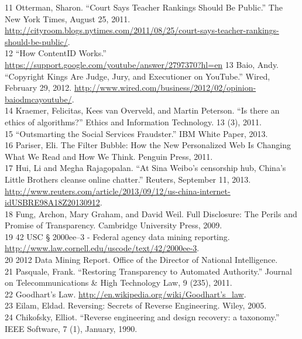 11 Otterman, Sharon. ``Court Says Teacher Rankings Should Be Public.'' The New York Times, August 25, 2011. \href{http://cityroom.blogs.nytimes.com/2011/08/25/court-says-teacher-rankings-should-be-public/}{http://cityroom.blogs.nytimes.com/2011/08/25/court-says-teacher-rankings-should-be-public/}. \\
12 ``How ContentID Works.'' \href{https://support.google.com/youtube/answer/2797370?hl=en}{https://support.google.com/youtube/answer/2797370?hl=en} 
13 Baio, Andy. ``Copyright Kings Are Judge, Jury, and Executioner on YouTube.'' Wired, February 29, 2012. \href{http://www.wired.com/business/2012/02/opinion-baiodmcayoutube/}{http://www.wired.com/business/2012/02/opinion-baiodmcayoutube/}. \\
14 Kraemer, Felicitas, Kees van Overveld, and Martin Peterson. ``Is there an ethics of algorithms?'' Ethics and Information Technology. 13 (3), 2011. \\
15 ``Outsmarting the Social Services Fraudster.'' IBM White Paper, 2013. \\
16 Pariser, Eli. The Filter Bubble: How the New Personalized Web Is Changing What We Read and How We Think. Penguin Press, 2011. \\
17 Hui, Li and Megha Rajagopalan. ``At Sina Weibo's censorship hub, China's Little Brothers cleanse online chatter.'' Reuters, September 11, 2013. \href{http://www.reuters.com/article/2013/09/12/us-china-internet-idUSBRE98A18Z20130912}{http://www.reuters.com/article/2013/09/12/us-china-internet-idUSBRE98A18Z20130912}. \\
18 Fung, Archon, Mary Graham, and David Weil. Full Disclosure: The Perils and Promise of Transparency. Cambridge University Press, 2009. \\
19 42 USC § 2000ee–3 - Federal agency data mining reporting. \href{http://www.law.cornell.edu/uscode/text/42/2000ee-3}{http://www.law.cornell.edu/uscode/text/42/2000ee-3}. \\
20 2012 Data Mining Report. Office of the Director of National Intelligence. \\
21 Pasquale, Frank. ``Restoring Transparency to Automated Authority.'' Journal on Telecommunications & High Technology Law, 9 (235), 2011. \\
22 Goodhart's Law. \href{http://en.wikipedia.org/wiki/Goodhart's_law}{http://en.wikipedia.org/wiki/Goodhart's_law}. \\
23 Eilam, Eldad. Reversing: Secrets of Reverse Engineering. Wiley, 2005. \\
24 Chikofsky, Elliot. ``Reverse engineering and design recovery: a taxonomy.'' IEEE Software, 7 (1), January, 1990. \\
